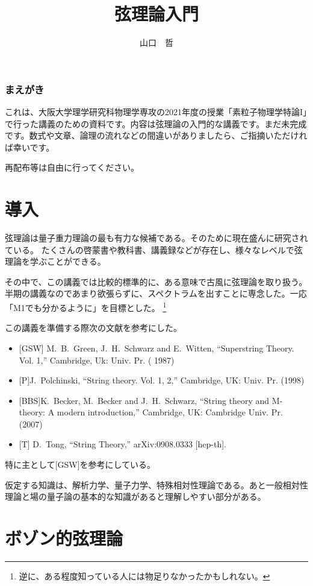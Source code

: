 \documentclass[report,paper=a4, fontsize=12pt, line_length=16cm, number_of_lines=33,dvipdfmx]{jlreq}
\numberwithin{equation}{chapter}
\numberwithin{equation}{section}
\begin{document}
\title{弦理論入門}
\author{山口　哲}
\maketitle
\tableofcontents
\subsection*{まえがき}
これは、大阪大学理学研究科物理学専攻の2021年度の授業「素粒子物理学特論I」で行った講義のための資料です。内容は弦理論の入門的な講義です。まだ未完成です。数式や文章、論理の流れなどの間違いがありましたら、ご指摘いただければ幸いです。

再配布等は自由に行ってください。

\chapter{導入}
弦理論は量子重力理論の最も有力な候補である。そのために現在盛んに研究されている。
たくさんの啓蒙書や教科書、講義録などが存在し、様々なレベルで弦理論を学ぶことができる。

その中で、この講義では比較的標準的に、ある意味で古風に弦理論を取り扱う。半期の講義なのであまり欲張らずに、スペクトラムを出すことに専念した。一応「M1でも分かるように」を目標とした。
\footnote{逆に、ある程度知っている人には物足りなかったかもしれない。}

この講義を準備する際次の文献を参考にした。
\begin{itemize}
 \item {} [GSW] M.~B.~Green, J.~H.~Schwarz and E.~Witten,
  ``Superstring Theory. Vol. 1,''
  Cambridge, Uk: Univ. Pr. ( 1987) 
\item {}[P]J.~Polchinski,
  ``String theory. Vol. 1, 2,''
  Cambridge, UK: Univ. Pr. (1998)
 \item {}[BBS]K.~Becker, M.~Becker and J.~H.~Schwarz,
  ``String theory and M-theory: A modern introduction,''
  Cambridge, UK: Cambridge Univ. Pr. (2007)
\item {}[T] D.~Tong,
  ``String Theory,''
  arXiv:0908.0333 [hep-th].
\end{itemize}
特に主として[GSW]を参考にしている。

仮定する知識は、解析力学、量子力学、特殊相対性理論である。あと一般相対性理論と場の量子論の基本的な知識があると理解しやすい部分がある。
\chapter{ボゾン的弦理論}
\end{document}
